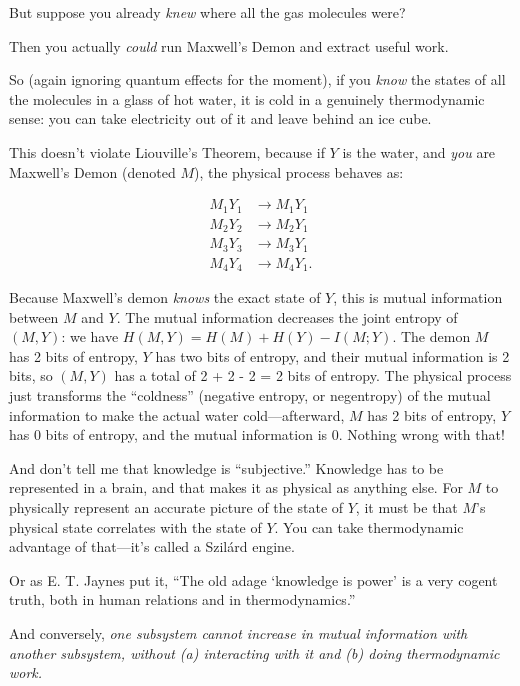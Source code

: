 {
 But suppose you already \textit{knew} where all the gas molecules
were?}

{
 Then you actually \textit{could} run Maxwell's
Demon and extract useful work.}

{
 So (again ignoring quantum effects for the moment), if you
\textit{know} the states of all the molecules in a glass of hot water,
it is cold in a genuinely thermodynamic sense: you can take electricity
out of it and leave behind an ice cube.}

{
 This doesn't violate Liouville's
Theorem, because if $Y$ is the water, and \textit{you} are
Maxwell's Demon (denoted $M$), the physical process
behaves as:}

\begin{align*}
 M_{1}Y_{1} &\rightarrow M_{1}Y_{1}  \\
 M_{2}Y_{2} &\rightarrow M_{2}Y_{1} \\
 M_{3}Y_{3} &\rightarrow M_{3}Y_{1} \\
 M_{4}Y_{4} &\rightarrow M_{4}Y_{1}.
\end{align*}

{
 Because Maxwell's demon \textit{knows} the exact
state of $Y$, this is mutual information between $M$ and $Y$. The mutual
information decreases the joint entropy of $(M,Y)$: we have $H(M,Y) = H(M)
+ H(Y) - I(M;Y)$. The demon $M$ has 2 bits of entropy, $Y$ has two bits of
entropy, and their mutual information is 2 bits, so $(M,Y)$ has a total
of 2 + 2 - 2 = 2 bits of entropy. The physical process just transforms
the ``coldness'' (negative entropy,
or negentropy) of the mutual information to make the actual water
cold---afterward, $M$ has 2 bits of entropy, $Y$ has 0 bits of entropy, and
the mutual information is 0. Nothing wrong with that!}

{
 And don't tell me that knowledge is
``subjective.'' Knowledge has to be
represented in a brain, and that makes it as physical as anything else.
For $M$ to physically represent an accurate picture of the state of $Y$, it
must be that $M$'s physical state correlates with the
state of $Y$. You can take thermodynamic advantage of
that---it's called a Szilárd engine.}

{
 Or as E. T. Jaynes put it, ``The old adage
`knowledge is power' is a very cogent
truth, both in human relations and in
thermodynamics.''}

{
 And conversely, \textit{one subsystem cannot increase in mutual
information with another subsystem, without (a) interacting with it and
(b) doing thermodynamic work.}}


